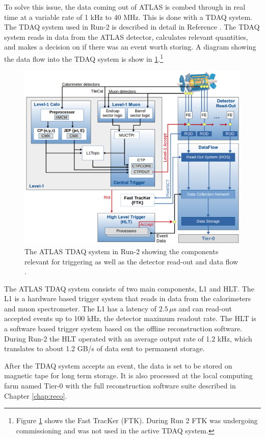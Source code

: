 		To solve this issue, the data coming out of \gls{ATLAS} is combed through in real time at a variable rate of 1 kHz to 40 MHz. This is done with a \gls{TDAQ} system. The \gls{TDAQ} system used in Run-2 is described in detail in Reference \cite{ATLAS-trigger-Run2}. The \gls{TDAQ} system reads in data from the \gls{ATLAS} detector, calculates relevant quantities, and makes a decision on if there was an event worth storing. A diagram showing the data flow into the \gls{TDAQ} system is show in \ref{fig:trigger-run2}.\footnote{Figure \ref{fig:trigger-run2} shows the Fast TracKer (FTK). During Run 2 FTK was undergoing commissioning and was not used in the active \gls{TDAQ} system.} 
		\begin{figure}[!ht]
		\centering
		\includegraphics[width=\textwidth,keepaspectratio=true]{chapters/chapter3_experiment/images/tdaq-run2-schematic2017.png}
		\caption{The \gls{ATLAS} \gls{TDAQ} system in Run-2 showing the components relevant for triggering as well as the detector read-out and data flow \cite{TDAQ_Diagram}.}
		\label{fig:trigger-run2}
		\end{figure}
		The \gls{ATLAS} \gls{TDAQ} system consists of two main components, \gls{L1} and \gls{HLT}. The \gls{L1} is a hardware based trigger system that reads in data from the calorimeters and muon spectrometer. The \gls{L1} has a latency of $2.5 \, \mu \mathrm{s}$ and can read-out accepted events up to 100 kHz, the detector maximum readout rate. The \gls{HLT} is a software based trigger system based on the offline reconstruction software. During Run-2 the \gls{HLT} operated with an average output rate of 1.2 kHz, which translates to about 1.2 GB/s of data sent to permanent storage.	

		After the \gls{TDAQ} system accepts an event, the data is set to be stored on magnetic tape for long term storage. It is also processed at the local computing farm named Tier-0 with the full reconstruction software suite described in Chapter \ref{chap:reco}.


